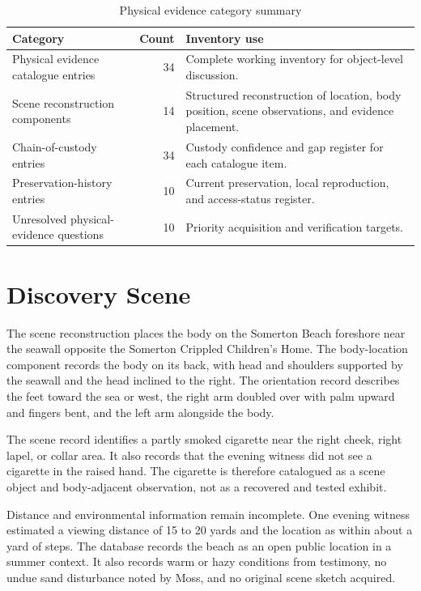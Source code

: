 \begin{table}[htbp]
\centering
\caption{Physical evidence category summary}
\label{tab:physical-evidence-category-summary}
\begin{tabularx}{\textwidth}{>{\raggedright\arraybackslash}p{}r>{\raggedright\arraybackslash}X}
\toprule
Category & Count & Inventory use \\
\midrule
Physical evidence catalogue entries & 34 & Complete working inventory for object-level discussion. \\
Scene reconstruction components & 14 & Structured reconstruction of location, body position, scene observations, and evidence placement. \\
Chain-of-custody entries & 34 & Custody confidence and gap register for each catalogue item. \\
Preservation-history entries & 10 & Current preservation, local reproduction, and access-status register. \\
Unresolved physical-evidence questions & 10 & Priority acquisition and verification targets. \\
\bottomrule
\end{tabularx}
\end{table}

\section{Discovery Scene}

The scene reconstruction places the body on the Somerton Beach foreshore near the seawall opposite the Somerton Crippled Children's Home. The body-location component records the body on its back, with head and shoulders supported by the seawall and the head inclined to the right. The orientation record describes the feet toward the sea or west, the right arm doubled over with palm upward and fingers bent, and the left arm alongside the body.

The scene record identifies a partly smoked cigarette near the right cheek, right lapel, or collar area. It also records that the evening witness did not see a cigarette in the raised hand. The cigarette is therefore catalogued as a scene object and body-adjacent observation, not as a recovered and tested exhibit.

Distance and environmental information remain incomplete. One evening witness estimated a viewing distance of 15 to 20 yards and the location as within about a yard of steps. The database records the beach as an open public location in a summer context. It also records warm or hazy conditions from testimony, no undue sand disturbance noted by Moss, and no original scene sketch acquired.

